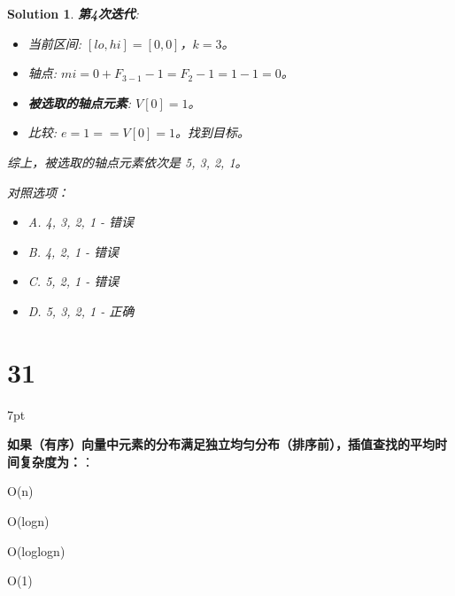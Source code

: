 \documentclass[UTF8]{report}
\newtheorem{solution}{Solution}
\theoremstyle{MyLineTheoremStyle} %
\theoremstyle{MyBlockTheoremStyle} %
\theoremstyle{MySubsubsectionStyle} %
\newenvironment{graybox}{%
        \def\FrameCommand{%
        \hspace{1pt}%
        {\color{gray}\small \vrule width 2pt}%
        {\color{graybox_color}\vrule width 4pt}%
        \colorbox{graybox_color}%
        }%
        \MakeFramed{\advance\hsize-\width\FrameRestore}%
        \noindent\hspace{-4.55pt}%
        \begin{adjustwidth}{}{7pt}%
        \vspace{2pt}\vspace{2pt}%
        }
        {%
        \vspace{2pt}\end{adjustwidth}\endMakeFramed%
        }
\begin{document}
\begin{solution}
\textbf{第4次迭代}:
\begin{itemize}
    \item 当前区间: $[lo, hi] = [0, 0]$，$k=3$。
    \item 轴点: $mi = 0 + F_{3-1} - 1 = F_2 - 1 = 1 - 1 = 0$。
    \item \textbf{被选取的轴点元素}: $V[0] = 1$。
    \item 比较: $e=1 == V[0]=1$。找到目标。
\end{itemize}

综上，被选取的轴点元素依次是 5, 3, 2, 1。

对照选项：
\begin{itemize}
    \item A. 4, 3, 2, 1 - 错误
    \item B. 4, 2, 1 - 错误
    \item C. 5, 2, 1 - 错误
    \item D. 5, 3, 2, 1 - 正确
\end{itemize}
\end{solution}


\section*{31}

\begin{graybox}
\textbf{如果（有序）向量中元素的分布满足独立均匀分布（排序前），插值查找的平均时间复杂度为：}：
\begin{circledenum}
    \item O(n)
    \item O(logn)
    \item O(loglogn)
    \item O(1)
\end{circledenum}
\end{graybox}
\end{document}
